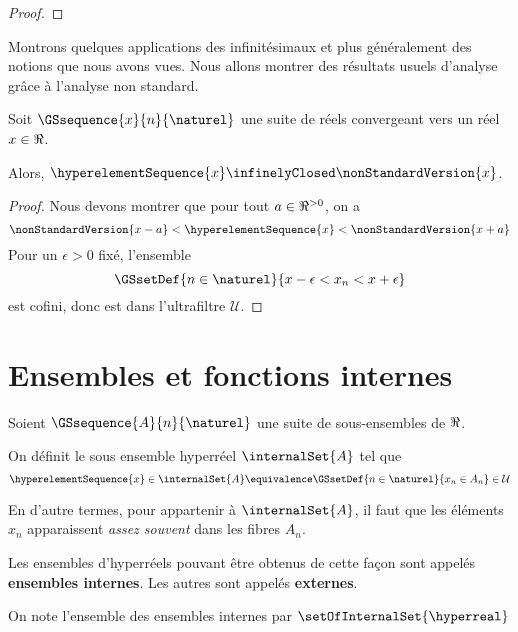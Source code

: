\ifdefined\outputproof
\begin{proof}

\end{proof}
\fi

Montrons quelques applications des infinitésimaux et plus généralement des
notions que nous avons vues. Nous allons montrer des résultats usuels d'analyse
grâce à l'analyse non standard.

\begin{proposition}
	Soit $\GSsequence{x}{n}{\naturel}$ une suite de réels convergeant vers un
	réel $x \in \real$.

	Alors, $\hyperelementSequence{x} \infinelyClosed \nonStandardVersion{x}$.
\end{proposition}

\ifdefined\outputproof
\begin{proof}
	Nous devons montrer que pour tout $a \in \real^{> 0}$, on a
	\begin{equation}
		\nonStandardVersion{x - a} < \hyperelementSequence{x} < \nonStandardVersion{x +
		a}
	\end{equation}
	Pour un $\epsilon > 0$ fixé, l'ensemble
	\begin{equation}
		\GSsetDef{n \in \naturel}{x - \epsilon < x_{n} < x + \epsilon}
	\end{equation}
	est cofini, donc est dans l'ultrafiltre $\mathcal{U}$.
\end{proof}
\fi

\section{Ensembles et fonctions internes}

\begin{definition} 
	Soient $\GSsequence{A}{n}{\naturel}$ une suite de sous-ensembles de $\real$.

	On définit le sous ensemble hyperréel $\internalSet{A}$
	tel que
	\begin{equation}
		\hyperelementSequence{x} \in \internalSet{A} \equivalence \GSsetDef{n \in
		\naturel}{x_{n} \in A_{n}} \in \mathcal{U}
	\end{equation}

	En d'autre termes, pour appartenir à $\internalSet{A}$, il faut que les
	éléments $x_{n}$ apparaissent \textit{assez souvent} dans les fibres $A_{n}$.

	Les ensembles d'hyperréels pouvant être obtenus de cette façon sont appelés
	\textbf{ensembles internes}. Les autres sont appelés \textbf{externes}.

	On note l'ensemble des ensembles internes par $\setOfInternalSet{\hyperreal}$

\end{definition}

